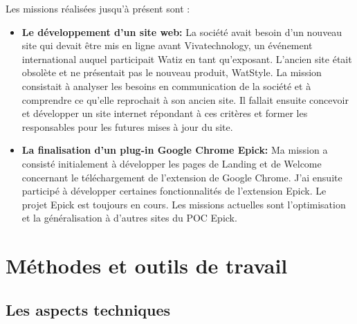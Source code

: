 \documentclass[a4paper, 12pt]{report}
\begin{document}
Les missions réalisées jusqu'à présent sont : 
\begin{itemize}
\item \textbf{Le développement d’un site web:}
La société avait besoin d’un nouveau site qui devait être mis en ligne avant Vivatechnology, un événement international auquel participait Watiz en tant qu’exposant.
L’ancien site était obsolète et ne présentait pas le nouveau produit, WatStyle. La mission consistait à analyser les besoins en communication de la société et à comprendre ce qu’elle reprochait à son ancien site. Il fallait ensuite concevoir et développer un site internet répondant à ces critères et former les responsables pour les futures mises à jour du site.

\item \textbf{La finalisation d’un plug-in Google Chrome Epick:} 
Ma mission a consisté initialement à développer les pages de Landing et de Welcome concernant le téléchargement de l'extension de Google Chrome. J’ai ensuite participé à développer certaines fonctionnalités de l’extension Epick. Le projet Epick est toujours en cours. Les missions actuelles sont l'optimisation et la généralisation à d'autres sites du POC Epick. 


\end{itemize} 

\chapter{Méthodes et outils de travail}
\section{Les aspects techniques}
\end{document}
